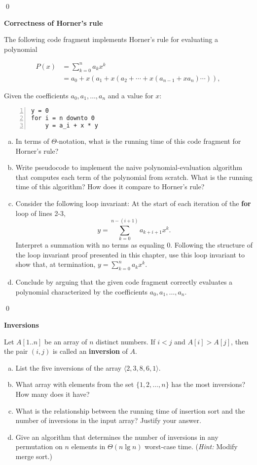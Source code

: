 \sol \qed

 \textbf{Correctness of Horner's rule}

The following code fragment implements Horner's rule for evaluating a polynomial

\begin{align*}
    P(x) &= \sum_{k=0}^n a_k x^k \\
    &= a_0 + x(a_1 + x(a_2 + \cdots + x(a_{n-1} + xa_n)\cdots )),
\end{align*}

Given the coefficients $a_0, a_1, \dots, a_n$ and a value for $x$:
\begin{Verbatim}[frame=single,numbers=left,samepage=true]
y = 0
for i = n downto 0
    y = a_i + x * y
\end{Verbatim}

\begin{enumerate}[(a)]
    \item In terms of $\Theta$-notation, what is the running time of this code fragment for Horner's rule?
    \item Write pseudocode to implement the naive polynomial-evaluation algorithm that computes each term of the polynomial from scratch. What is the running time of this algorithm? How does it compare to Horner's rule?
    \item Consider the following loop invariant: At the start of each iteration of the \textbf{for} loop of lines 2-3, $$y = \sum_{k=0}^{n - (i + 1)} a_{k+i+1}x^k.$$ Interpret a summation with no terms as equaling 0. Following the structure of the loop invariant proof presented in this chapter, use this loop invariant to show that, at termination, $y = \sum_{k=0}^n a_kx^k$.
    \item Conclude by arguing that the given code fragment correctly evaluates a polynomial characterized by the coefficients $a_0, a_1, \dots, a_n$.
\end{enumerate}

\sol \qed

 \textbf{Inversions}

Let $A[1..n]$ be an array of $n$ distinct numbers. If $i < j$ and $A[i] > A[j]$, then the pair $(i,j)$ is called an \textbf{inversion} of $A$.

\begin{enumerate}[(a)]
    \item List the five inversions of the array $\langle 2, 3, 8, 6, 1 \rangle$.
    \item What array with elements from the set $\{1, 2, \dots, n\}$ has the most inversions? How many does it have?
    \item What is the relationship between the running time of insertion sort and the number of inversions in the input array? Justify your answer.
    \item Give an algorithm that determines the number of inversions in any permutation on $n$ elements in $\Theta(n \lg n)$ worst-case time. (\textit{Hint:} Modify merge sort.)
\end{enumerate}

